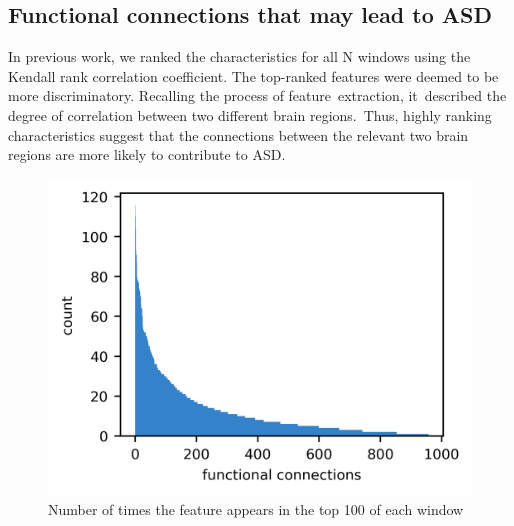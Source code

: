 \documentclass[a4paper]{cas-dc}
\begin{document}
\subsection{Functional connections that may lead to ASD}
In previous work, we ranked the characteristics for all N windows using the Kendall rank correlation coefficient. The top-ranked features were deemed to be more discriminatory. Recalling the process of feature extraction, it described the degree of correlation between two different brain regions. Thus, highly ranking characteristics suggest that the connections between the relevant two brain regions are more likely to contribute to ASD.
\begin{figure}[h]
	\centering
	\includegraphics[]{ff.png}
	\caption{Number of times the feature appears in the top 100 of each window}
\end{figure} 
\end{document}
